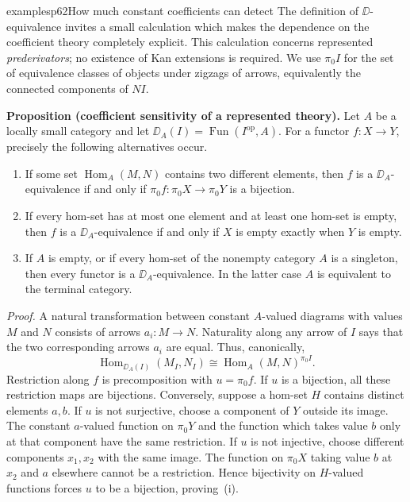 \begin{dcomment}{examples}{p62}{How much constant coefficients can detect}
The definition of $\DD$-equivalence invites a small calculation which makes the dependence on the coefficient theory completely explicit. This calculation concerns represented \emph{prederivators}; no existence of Kan extensions is required. We use $\pi_0I$ for the set of equivalence classes of objects under zigzags of arrows, equivalently the connected components of $NI$.

\textbf{Proposition (coefficient sensitivity of a represented theory).}
Let $A$ be a locally small category and let $\DD_A(I)=\operatorname{Fun}(I^{\mathrm{op}},A)$. For a functor $f:X\to Y$, precisely the following alternatives occur.
\begin{enumerate}[label=\textup{(\roman*)}]
\item If some set $\operatorname{Hom}_A(M,N)$ contains two different elements, then $f$ is a $\DD_A$-equivalence if and only if $\pi_0f:\pi_0X\to\pi_0Y$ is a bijection.
\item If every hom-set has at most one element and at least one hom-set is empty, then $f$ is a $\DD_A$-equivalence if and only if $X$ is empty exactly when $Y$ is empty.
\item If $A$ is empty, or if every hom-set of the nonempty category $A$ is a singleton, then every functor is a $\DD_A$-equivalence. In the latter case $A$ is equivalent to the terminal category.
\end{enumerate}

\emph{Proof.} A natural transformation between constant $A$-valued diagrams with values $M$ and $N$ consists of arrows $a_i:M\to N$. Naturality along any arrow of $I$ says that the two corresponding arrows $a_i$ are equal. Thus, canonically,
\[
\operatorname{Hom}_{\DD_A(I)}(M_I,N_I)
 \cong \operatorname{Hom}_A(M,N)^{\pi_0I}.
\]
Restriction along $f$ is precomposition with $u=\pi_0f$. If $u$ is a bijection, all these restriction maps are bijections. Conversely, suppose a hom-set $H$ contains distinct elements $a,b$. If $u$ is not surjective, choose a component of $Y$ outside its image. The constant $a$-valued function on $\pi_0Y$ and the function which takes value $b$ only at that component have the same restriction. If $u$ is not injective, choose different components $x_1,x_2$ with the same image. The function on $\pi_0X$ taking value $b$ at $x_2$ and $a$ elsewhere cannot be a restriction. Hence bijectivity on $H$-valued functions forces $u$ to be a bijection, proving~(i).


\end{dcomment}

